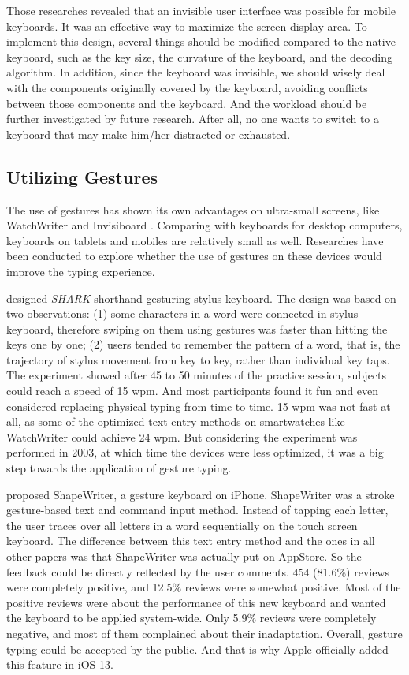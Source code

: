 \documentclass[11pt]{article}
\begin{document}
Those researches revealed that an invisible user interface was possible for mobile keyboards. It was an effective way to maximize the screen display area. To implement this design, several things should be modified compared to the native keyboard, such as the key size, the curvature of the keyboard, and the decoding algorithm. In addition, since the keyboard was invisible, we should wisely deal with the components originally covered by the keyboard, avoiding conflicts between those components and the keyboard. And the workload should be further investigated by future research. After all, no one wants to switch to a keyboard that may make him/her distracted or exhausted.

\subsection{Utilizing Gestures}
The use of gestures has shown its own advantages on ultra-small screens, like WatchWriter \citep{10.1145/2858036.2858242} and Invisiboard \citep{10.1145/2935334.2935360}. Comparing with keyboards for desktop computers, keyboards on tablets and mobiles are relatively small as well. Researches have been conducted to explore whether the use of gestures on these devices would improve the typing experience.

\citet{10.1145/642611.642630} designed \textit{SHARK} shorthand gesturing stylus keyboard. The design was based on two observations: (1) some characters in a word were connected in stylus keyboard, therefore swiping on them using gestures was faster than hitting the keys one by one; (2) users tended to remember the pattern of a word, that is, the trajectory of stylus movement from key to key, rather than individual key taps. The experiment showed after 45 to 50 minutes of the practice session, subjects could reach a speed of 15 wpm. And most participants found it fun and even considered replacing physical typing from time to time. 15 wpm was not fast at all, as some of the optimized text entry methods on smartwatches like WatchWriter \citep{10.1145/2858036.2858242} could achieve 24 wpm. But considering the experiment was performed in 2003, at which time the devices were less optimized, it was a big step towards the application of gesture typing.

\citet{10.1145/1520340.1520380} proposed ShapeWriter, a gesture keyboard on iPhone. ShapeWriter was a stroke gesture-based text and command input method. Instead of tapping each letter, the user traces over all letters in a word sequentially on the touch screen keyboard. The difference between this text entry method and the ones in all other papers was that ShapeWriter was actually put on AppStore. So the feedback could be directly reflected by the user comments. 454 (81.6\%) reviews were completely positive, and 12.5\% reviews were somewhat positive. Most of the positive reviews were about the performance of this new keyboard and wanted the keyboard to be applied system-wide. Only 5.9\% reviews were completely negative, and most of them complained about their inadaptation. Overall, gesture typing could be accepted by the public. And that is why Apple officially added this feature in iOS 13.
\end{document}
